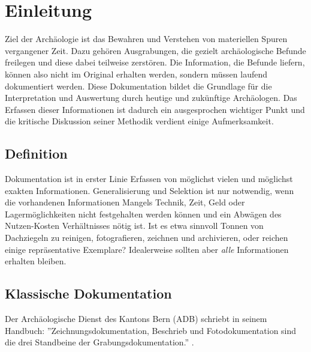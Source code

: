 \chapter{Einleitung}
	Ziel der Archäologie ist das Bewahren und Verstehen von materiellen Spuren vergangener Zeit. Dazu gehören Ausgrabungen, die gezielt archäologische Befunde freilegen und diese dabei teilweise zerstören. Die Information, die Befunde liefern, können also nicht im Original erhalten werden, sondern müssen laufend dokumentiert werden. Diese Dokumentation bildet die Grundlage für die Interpretation und Auswertung durch heutige und zukünftige Archäologen.
	Das Erfassen dieser Informationen ist dadurch ein ausgesprochen wichtiger Punkt und die kritische Diskussion seiner Methodik verdient einige Aufmerksamkeit.
	
	\section{Definition}
		Dokumentation ist in erster Linie Erfassen von möglichst vielen und möglichst exakten Informationen. Generalisierung und Selektion ist nur notwendig, wenn die vorhandenen Informationen Mangels Technik, Zeit, Geld oder Lagermöglichkeiten nicht festgehalten werden können und ein Abwägen des Nutzen-Kosten Verhältnisses nötig ist. Ist es etwa sinnvoll Tonnen von Dachziegeln zu reinigen, fotografieren, zeichnen und archivieren, oder reichen einige repräsentative Exemplare?
		Idealerweise sollten aber \emph{alle} Informationen erhalten bleiben.
		
	\section{Klassische Dokumentation}
		Der Archäologische Dienst des Kantons Bern (ADB) schriebt in seinem Handbuch: ''Zeichnungsdokumentation, Beschrieb und Fotodokumentation sind die drei Standbeine der Grabungsdokumentation.'' .
		
